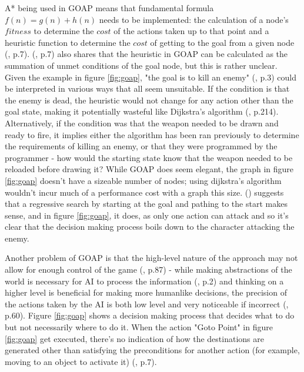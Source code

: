 \documentclass[11pt, a4paper]{article}
\begin{document}
A* being used in GOAP means that fundamental formula $f(n) = g(n) + h(n)$ needs to be implemented: the calculation of a node's $fitness$ to determine the $cost$ of the actions taken up to that point and a heuristic function to determine the $cost$ of getting to the goal from a given node (\cite{orkin2003applying}, p.7). \citeauthor{orkin2003applying} (\citeyear{orkin2003applying}, p.7) also shares that the heuristic in GOAP can be calculated as the summation of unmet conditions of the goal node, but this is rather unclear. Given the example in figure \ref{fig:goap}, "the goal is to kill an enemy" (\cite{orkin2003applying}, p.3) could be interpreted in various ways that all seem unsuitable. If the condition is that the enemy is dead, the heuristic would not change for any action other than the goal state, making it potentially wasteful like Dijkstra's algorithm (\cite{millington2019ai}, p.214). Alternatively, if the condition was that the weapon needed to be drawn and ready to fire, it implies either the algorithm has been ran previously to determine the requirements of killing an enemy, or that they were programmed by the programmer - how would the starting state know that the weapon needed to be reloaded before drawing it? While GOAP does seem elegant, the graph in figure \ref{fig:goap} doesn't have a sizeable number of nodes; using dijkstra's algorithm wouldn't incur much of a performance cost with a graph this size. \citeauthor{orkin2003applying} (\citeyear{orkin2003applying}) suggests that a regressive search by starting at the goal and pathing to the start makes sense, and in figure \ref{fig:goap}, it does, as only one action can attack and so it's clear that the decision making process boils down to the character attacking the enemy.

Another problem of GOAP is that the high-level nature of the approach may not allow for enough control of the game (\cite{stanciu2012implementing}, p.87) - while making abstractions of the world is necessary for AI to process the information (\cite{buro2004call}, p.2) and thinking on a higher level is beneficial for making more humanlike decisions, the precision of the actions taken by the AI is both low level and very noticeable if incorrect (\cite{graham2003pathfinding}, p.60). Figure \ref{fig:goap} shows a decision making process that decides what to do but not necessarily where to do it. When the action "Goto Point" in figure \ref{fig:goap} get executed, there's no indication of how the destinations are generated other than satisfying the preconditions for another action (for example, moving to an object to activate it) (\cite{orkin2003applying}, p.7). 
\end{document}
